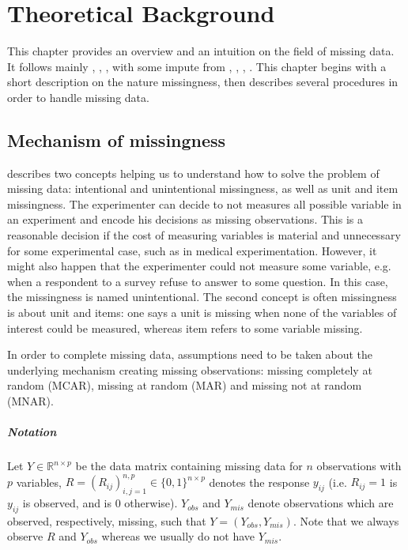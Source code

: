 \chapter{Theoretical Background}

This chapter provides an overview and an intuition on the field of missing
data. It follows mainly \cite{schafer2002missing},
\cite{little2002statistical}, \cite{van2012flexible}, with some impute from
\cite{wikipediaImputation2015}, \cite{matloffblog2015}, \cite{gelman2006data},
\cite{troyanskaya2001missing}. This chapter begins with a short description on
the nature missingness, then describes several procedures in order to handle
missing data.

\section{Mechanism of missingness}
\label{sec:source-missingness}

\cite{van2012flexible} describes two concepts helping us to understand how to
solve the problem of missing data: intentional and unintentional missingness,
as well as unit and item missingness. The experimenter can decide to not
measures all possible variable in an experiment and encode his decisions as
missing observations. This is a reasonable decision if the cost of measuring
variables is material and unnecessary for some experimental case, such as in
medical experimentation. However, it might also happen that the experimenter
could not measure some variable, e.g. when a respondent to a survey refuse to
answer to some question. In this case, the missingness is named
unintentional. The second concept is often missingness is about unit and items:
one says a unit is missing when none of the variables of interest could be
measured, whereas item refers to some variable missing.

In order to complete missing data, assumptions need to be taken about the
underlying mechanism creating missing observations: missing completely at
random (MCAR), missing at random (MAR) and missing not at random (MNAR).

\paragraph{Notation}

Let $Y \in \mathbb{R}^{n\times p}$ be the data matrix containing missing data
for $n$ observations with $p$ variables,
$R = (R_{ij})_{i,j=1}^{n,p} \in \{0, 1\}^{n\times p}$ denotes the response
$y_{ij}$ (i.e. $R_{ij} = 1$ is $y_{ij}$ is observed, and is $0$
otherwise). $Y_{obs}$ and $Y_{mis}$ denote observations which are observed,
respectively, missing, such that $Y=(Y_{obs}, Y_{mis})$. Note that we always
observe $R$ and $Y_{obs}$ whereas we usually do not have $Y_{mis}$.

